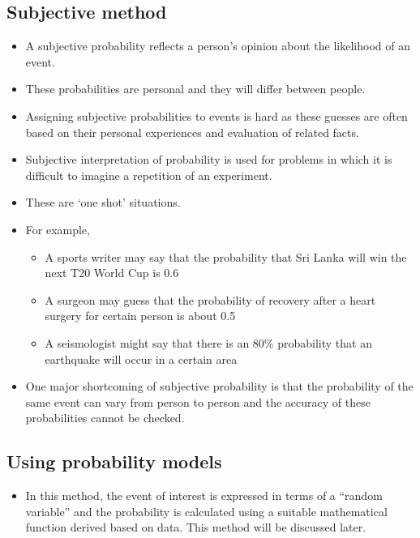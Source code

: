 \documentclass[]{book}
\providecommand{\tightlist}{%
  \setlength{\itemsep}{0pt}\setlength{\parskip}{0pt}}
\begin{document}
\hypertarget{subjective-method}{%
\subsection{Subjective method}\label{subjective-method}}

\begin{itemize}
\tightlist
\item
  A subjective probability reflects a person's opinion about the likelihood of an event.
\item
  These probabilities are personal and they will differ between people.
\item
  Assigning subjective probabilities to events is hard as these guesses are often based on their personal experiences and evaluation of related facts.
\item
  Subjective interpretation of probability is used for problems in which it is difficult to imagine a repetition of an experiment.
\item
  These are `one shot' situations.
\item
  For example,

  \begin{itemize}
  \tightlist
  \item
    A sports writer may say that the probability that Sri Lanka will win the next T20 World Cup is 0.6
  \item
    A surgeon may guess that the probability of recovery after a heart surgery for certain person is about 0.5
  \item
    A seismologist might say that there is an 80\% probability that an earthquake will occur in a certain area
  \end{itemize}
\item
  One major shortcoming of subjective probability is that the probability of the same event can vary from person to person and the accuracy of these probabilities cannot be checked.
\end{itemize}

\hypertarget{using-probability-models}{%
\subsection{Using probability models}\label{using-probability-models}}

\begin{itemize}
\tightlist
\item
  In this method, the event of interest is expressed in terms of a ``random variable'' and the probability is calculated using a suitable mathematical function derived based on data. This method will be discussed later.
\end{itemize}
\end{document}
